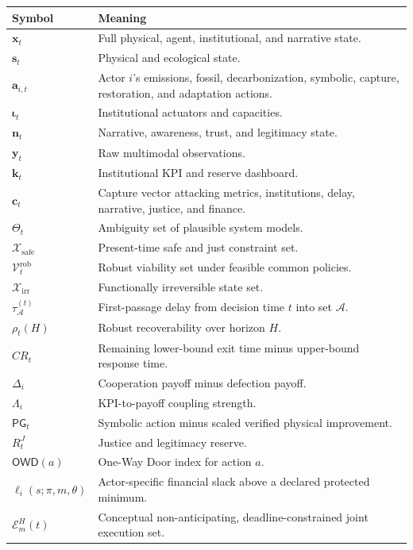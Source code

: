 \documentclass[11pt,a4paper]{article}
\numberwithin{equation}{section}
\theoremstyle{definition}
\theoremstyle{plain}
\theoremstyle{remark}
\newcommand{\safe}{\mathcal{X}_{\mathrm{safe}}}
\newcommand{\irrev}{\mathcal{X}_{\mathrm{irr}}}
\newcommand{\state}{\bm{x}}
\newcommand{\kpi}{\bm{k}}
\newcommand{\action}{\bm{a}}
\newcommand{\capture}{\bm{c}}
\newcommand{\inst}{\bm{\iota}}
\newcommand{\narr}{\bm{n}}
\begin{document}
\begin{longtable}{@{}L{0.20\textwidth}L{0.72\textwidth}@{}}
\toprule
\textbf{Symbol} & \textbf{Meaning} \\
\midrule
$\state_t$ & Full physical, agent, institutional, and narrative state. \\
$\bm{s}_t$ & Physical and ecological state. \\
$\action_{i,t}$ & Actor $i$'s emissions, fossil, decarbonization, symbolic, capture, restoration, and adaptation actions. \\
$\inst_t$ & Institutional actuators and capacities. \\
$\narr_t$ & Narrative, awareness, trust, and legitimacy state. \\
$\bm y_t$ & Raw multimodal observations. \\
$\kpi_t$ & Institutional KPI and reserve dashboard. \\
$\capture_t$ & Capture vector attacking metrics, institutions, delay, narrative, justice, and finance. \\
$\Theta_t$ & Ambiguity set of plausible system models. \\
$\safe$ & Present-time safe and just constraint set. \\
$\mathcal V_t^{\mathrm{rob}}$ & Robust viability set under feasible common policies. \\
$\irrev$ & Functionally irreversible state set. \\
$\tau_{\mathcal A}^{(t)}$ & First-passage delay from decision time $t$ into set $\mathcal A$. \\
$\rho_t(H)$ & Robust recoverability over horizon $H$. \\
$CR_t$ & Remaining lower-bound exit time minus upper-bound response time. \\
$\Delta_i$ & Cooperation payoff minus defection payoff. \\
$\Lambda_i$ & KPI-to-payoff coupling strength. \\
$\mathsf{PG}_t$ & Symbolic action minus scaled verified physical improvement. \\
$R_t^J$ & Justice and legitimacy reserve. \\
$\mathsf{OWD}(a)$ & One-Way Door index for action $a$. \\
$\ell_i(s;\pi,m,\theta)$ & Actor-specific financial slack above a declared protected minimum. \\
$\mathcal E_m^H(t)$ & Conceptual non-anticipating, deadline-constrained joint execution set. \\
\bottomrule
\end{longtable}
\end{document}

